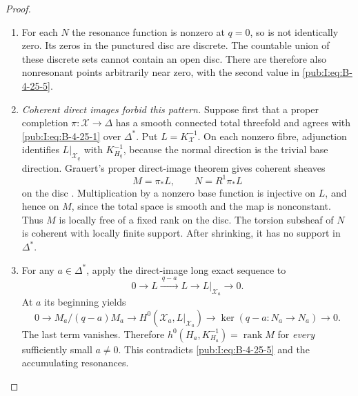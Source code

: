 \begin{proof}
\begin{enumerate}[label=\arabic*.,leftmargin=*]
\item For each $N$ the resonance function is nonzero at
$q=0$, so is not identically zero. Its zeros in the
punctured disc are discrete. The countable union of
these discrete sets cannot contain an open disc.
There are therefore also nonresonant points arbitrarily
near zero, with the second value in \eqref{pub:I:eq:B-4-25-5}.

\item \emph{Coherent direct images forbid this pattern.}
Suppose first that a proper completion
$\pi:\mathcal X\to\Delta$ has a smooth connected
total threefold and agrees with \eqref{pub:I:eq:B-4-25-1} over
$\Delta^*$. Put $L=K_{\mathcal X}^{-1}$.
On each nonzero fibre, adjunction identifies
$L|_{\mathcal X_q}$ with $K_{H_q}^{-1}$, because
the normal direction is the trivial base direction.
Grauert's proper direct-image theorem gives coherent
sheaves
\[
 M=\pi_*L,\qquad N=R^1\pi_*L
\]
on the disc
\citep[Section 6, Hauptsatz I, p.~59]{Grauert60}.
Multiplication by a nonzero base function is injective
on $L$, and hence on $M$, since the total space is
smooth and the map is nonconstant. Thus $M$ is
locally free of a fixed rank on the disc. The torsion
subsheaf of $N$ is coherent with locally finite
support. After shrinking, it has no support in
$\Delta^*$.

\item For any $a\in\Delta^*$, apply the direct-image long
exact sequence to
\[
 0\longrightarrow L\xrightarrow{\ q-a\ }L
 \longrightarrow L|_{\mathcal X_a}\longrightarrow0.
\]
At $a$ its beginning yields
\begin{equation}
 0\longrightarrow M_a/(q-a)M_a
 \longrightarrow H^0(\mathcal X_a,L|_{\mathcal X_a})
 \longrightarrow \ker(q-a:N_a\to N_a)
 \longrightarrow0.
\label{pub:I:eq:B-4-25-6}
\end{equation}
The last term vanishes. Therefore
$h^0(H_a,K_{H_a}^{-1})=\operatorname{rank}M$ for
\emph{every} sufficiently small $a\ne0$. This
contradicts \eqref{pub:I:eq:B-4-25-5} and the accumulating resonances.


\end{enumerate}
\end{proof}
